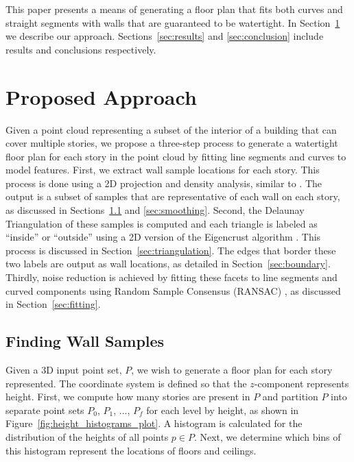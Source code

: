 \documentclass[10pt,twocolumn,letterpaper]{article}
\begin{document}
This paper presents a means of generating a floor plan that fits both curves and straight segments with walls that are guaranteed to be watertight.  In Section~\ref{sec:procedure} we describe our approach.  Sections~\ref{sec:results} and \ref{sec:conclusion} include results and conclusions respectively.

\section{Proposed Approach}
\label{sec:procedure}

Given a point cloud representing a subset of the interior of a building that can cover multiple stories, we propose a three-step process to generate a watertight floor plan for each story in the point cloud by fitting line segments and curves to model features.  First, we extract wall sample locations for each story.  This process is done using a 2D projection and density analysis, similar to \cite{Okorn09}.  The output is a subset of samples that are representative of each wall on each story, as discussed in Sections~\ref{sec:wall_samples} and \ref{sec:smoothing}.  Second, the Delaunay Triangulation of these samples is computed and each triangle is labeled as ``inside'' or ``outside'' using a 2D version of the Eigencrust algorithm \cite{Eigencrust}.  This process is discussed in Section~\ref{sec:triangulation}.  The edges that border these two labels are output as wall locations, as detailed in Section~\ref{sec:boundary}.  Thirdly, noise reduction is achieved by fitting these facets to line segments and curved components using Random Sample Consensus (RANSAC) \cite{Ransac}, as discussed in Section~\ref{sec:fitting}.

\subsection{Finding Wall Samples}
\label{sec:wall_samples}

Given a 3D input point set, $P$, we wish to generate a floor plan for each story represented.  The coordinate system is defined so that the $z$-component represents height.  First, we compute how many stories are present in $P$ and partition $P$ into separate point sets $P_0$, $P_1$, ..., $P_f$ for each level by height, as shown in Figure~\ref{fig:height_histograms_plot}.  A histogram is calculated for the distribution of the heights of all points $p \in P$.  Next, we determine which bins of this histogram represent the locations of floors and ceilings.
\end{document}
